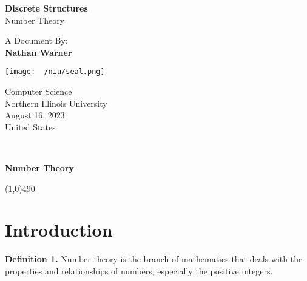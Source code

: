 \documentclass{report}
\title{\Huge{}}
\author{\huge{Nathan Warner}}
\date{\huge{}}
\begin{document}
        \begin{titlepage}
       \begin{center}
           \vspace*{1cm}
    
           \textbf{Discrete Structures} \\
           \vspace{0.5cm}
           Number Theory
            
                
           \vspace{1.5cm}
            A Document By:  \\
           \textbf{Nathan Warner}
    
           \vfill
                
                
           \vspace{0.8cm}
         
           \texttt{[image: ~/niu/seal.png]}
                
           Computer Science \\
           Northern Illinois University\\
           August 16, 2023 \\
           United States\\
           
                
       \end{center}
    \end{titlepage}
    \tableofcontents
    \pagebreak \bigbreak \noindent
    \vspace{2in} \\
    \begin{Huge}
        \textbf{Number \bigbreak \noindent  Theory}
    \end{Huge}
    \smallbreak \noindent
    \line(1,0){490}
    \section{\LARGE Introduction}
    \bigbreak \noindent 
    \textbf{Definition 1.} Number theory is the branch of mathematics that deals with the properties and relationships of numbers, especially the positive integers.

    \bigbreak \noindent \bigbreak \noindent 
\end{document}
